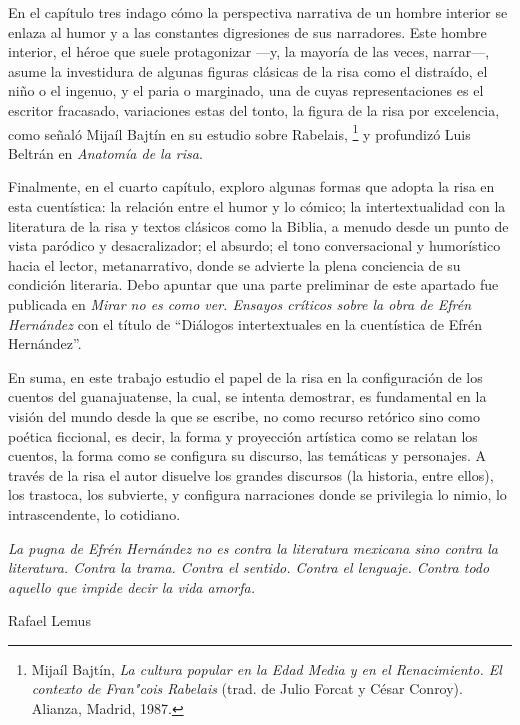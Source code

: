\documentclass[14pt,twoside,final]{extbook} %
\let\oldfootnote\footnote
\renewcommand\footnote[1]{%
\oldfootnote{\hspace{1mm}#1}}
\begin{document}
En el capítulo tres indago cómo la perspectiva narrativa de un hombre interior se enlaza al humor y a las constantes digresiones de sus narradores. Este hombre interior, el héroe que suele protagonizar ---y, la mayoría de las veces, narrar---, asume la investidura de algunas figuras clásicas de la risa como el distraído, el niño o el ingenuo, y el paria o marginado, una de cuyas representaciones es el escritor fracasado, variaciones estas del tonto, la figura de la risa por excelencia, como señaló Mijaíl Bajtín en su estudio sobre Rabelais,\footnote{Mijaíl Bajtín, \emph{La cultura popular en la Edad Media y en el Renacimiento. El contexto de Fran"cois Rabelais} (trad. de Julio Forcat y César Conroy). Alianza, Madrid, 1987.} y profundizó Luis Beltrán en \emph{Anatomía de la risa}.

Finalmente, en el cuarto capítulo, exploro algunas formas que adopta la risa en esta cuentística: la relación entre el humor y lo cómico; la intertextualidad con la literatura de la risa y textos clásicos como la Biblia, a menudo desde un punto de vista paródico y desacralizador; el absurdo; el tono conversacional y humorístico hacia el lector, metanarrativo, donde se advierte la plena conciencia de su condición literaria. Debo apuntar que una parte preliminar de este apartado fue publicada en \emph{Mirar no es como ver. Ensayos críticos sobre la obra de Efrén Hernández} con el título de ``Diálogos intertextuales en la cuentística de Efrén Hernández''.

En suma, en este trabajo estudio el papel de la risa en la configuración de los cuentos del guanajuatense, la cual, se intenta demostrar, es fundamental en la visión del mundo desde la que se escribe, no como recurso retórico sino como poética ficcional, es decir, la forma y proyección artística como se relatan los cuentos, la forma como se configura su discurso, las temáticas y personajes. A través de la risa el autor disuelve los grandes discursos (la historia, entre ellos), los trastoca, los subvierte, y configura narraciones donde se privilegia lo nimio, lo intrascendente, lo cotidiano.
\cleardoublepage
\newpage
\pagestyle{empty}
\vspace*{42pt}
\begin{flushright}
\begin{minipage}{7.5cm}
\emph{La pugna de Efrén Hernández no es contra la literatura mexicana sino contra la literatura. Contra la trama. Contra el sentido. Contra el lenguaje. Contra todo aquello que impide decir la vida amorfa.}
\begin{flushright}
Rafael Lemus
\end{flushright}
\end{minipage}
\end{flushright}
\end{document}
